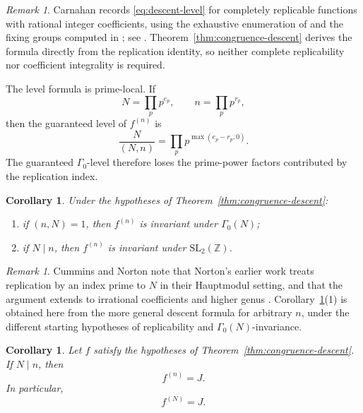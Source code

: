 \documentclass[12pt]{amsart}
\newtheorem{cor}[thm]{Corollary}
\theoremstyle{definition}
\theoremstyle{remark}
\newtheorem{remark}[thm]{Remark}
\numberwithin{equation}{section}
\newcommand{\Z}{\mathbb Z}
\begin{document}
\begin{remark}\label{rem:carnahan-comparison}
Carnahan records \eqref{eq:descent-level} for completely replicable functions with rational integer coefficients, using the exhaustive enumeration of \cite{alexander-cummins-mckay-simons} and the fixing groups computed in \cite{ferenbaugh}; see \cite[Corollary~5.6]{carnahan}. Theorem~\ref{thm:congruence-descent} derives the formula directly from the replication identity, so neither complete replicability nor coefficient integrality is required.
\end{remark}

The level formula is prime-local. If
\[
N=\prod_p p^{e_p},
\qquad
n=\prod_p p^{r_p},
\]
then the guaranteed level of $f^{(n)}$ is
\begin{equation}\label{eq:valuation-level}
\frac{N}{(N,n)}
=
\prod_p p^{\max(e_p-r_p,0)}.
\end{equation}
The guaranteed $\Gamma_0$-level therefore loses the prime-power factors contributed by the replication index.

\begin{cor}\label{cor:coprime-preserve}
Under the hypotheses of Theorem~\ref{thm:congruence-descent}:
\begin{enumerate}
\item if $(n,N)=1$, then $f^{(n)}$ is invariant under $\Gamma_0(N)$;
\item if $N\mid n$, then $f^{(n)}$ is invariant under $\mathrm{SL}_2(\Z)$.
\end{enumerate}
\end{cor}

\begin{remark}
Cummins and Norton note that Norton's earlier work treats replication by an index prime to $N$ in their Hauptmodul setting, and that the argument extends to irrational coefficients and higher genus \cite{cummins-norton,norton-nonmonstrous}. Corollary~\ref{cor:coprime-preserve}(1) is obtained here from the more general descent formula for arbitrary $n$, under the different starting hypotheses of replicability and $\Gamma_0(N)$-invariance.
\end{remark}

\begin{cor}\label{cor:J-final-level}
Let $f$ satisfy the hypotheses of Theorem~\ref{thm:congruence-descent}. If $N\mid n$, then
\begin{equation}\label{eq:multiple-N-J}
f^{(n)}=J.
\end{equation}
In particular,
\[
f^{(N)}=J.
\]
\end{cor}
\end{document}
